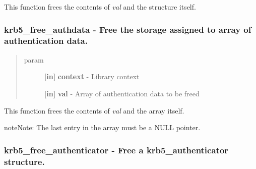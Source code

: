 \documentclass[letterpaper,10pt,english]{sphinxmanual}
\begin{document}
This function frees the contents of \emph{val} and the structure itself.


\subsubsection{krb5\_free\_authdata -  Free the storage assigned to array of authentication data.}
\label{appdev/refs/api/krb5_free_authdata::doc}\label{appdev/refs/api/krb5_free_authdata:krb5-free-authdata-free-the-storage-assigned-to-array-of-authentication-data}

\begin{fulllineitems}
\label{appdev/refs/api/krb5_free_authdata:krb5_free_authdata}
\end{fulllineitems}

\begin{quote}\begin{description}
\item[{param}] \leavevmode
\textbf{{[}in{]}} \textbf{context} - Library context

\textbf{{[}in{]}} \textbf{val} - Array of authentication data to be freed

\end{description}\end{quote}

This function frees the contents of \emph{val} and the array itself.

\begin{notice}{note}{Note:}
The last entry in the array must be a NULL pointer.
\end{notice}


\subsubsection{krb5\_free\_authenticator -  Free a krb5\_authenticator structure.}
\label{appdev/refs/api/krb5_free_authenticator:krb5-free-authenticator-free-a-krb5-authenticator-structure}\label{appdev/refs/api/krb5_free_authenticator::doc}

\begin{fulllineitems}
\label{appdev/refs/api/krb5_free_authenticator:krb5_free_authenticator}
\end{fulllineitems}
\end{document}
